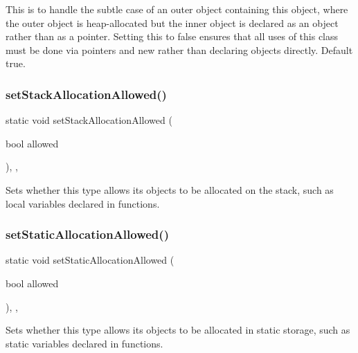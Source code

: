 This is to handle the subtle case of an outer object containing this object, where the outer object is heap-\/allocated but the inner object is declared as an object rather than as a pointer. Setting this to false ensures that all uses of this class must be done via pointers and new rather than declaring objects directly. Default true. \mbox{\label{classManaged_aafc988bee6bf29534c249cf50b6107fc}} 
\subsubsection{\texorpdfstring{set\+Stack\+Allocation\+Allowed()}{setStackAllocationAllowed()}}
{\footnotesize\ttfamily static void set\+Stack\+Allocation\+Allowed (\begin{DoxyParamCaption}\item[{bool}]{allowed }\end{DoxyParamCaption})\hspace{0.3cm}{\ttfamily [inline]}, {\ttfamily [static]}, {\ttfamily [protected]}}



Sets whether this type allows its objects to be allocated on the stack, such as local variables declared in functions. 

\mbox{\label{classManaged_a0322175a93f8a3246e9ef1ade5718493}} 
\subsubsection{\texorpdfstring{set\+Static\+Allocation\+Allowed()}{setStaticAllocationAllowed()}}
{\footnotesize\ttfamily static void set\+Static\+Allocation\+Allowed (\begin{DoxyParamCaption}\item[{bool}]{allowed }\end{DoxyParamCaption})\hspace{0.3cm}{\ttfamily [inline]}, {\ttfamily [static]}, {\ttfamily [protected]}}



Sets whether this type allows its objects to be allocated in static storage, such as static variables declared in functions. 

